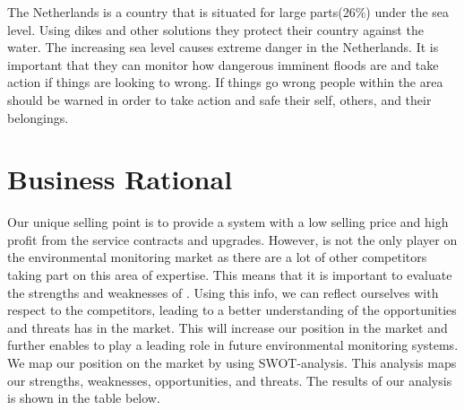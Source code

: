 The Netherlands is a country that is situated for large parts(26\%) under the sea level\cite{holland}. Using dikes and other solutions they protect their country against the water. The increasing sea level causes extreme danger in the Netherlands. It is important that they can monitor how dangerous imminent floods are and take action if things are looking to wrong. If things go wrong people within the area should be warned in order to take action and safe their self, others, and their belongings.

\section{Business Rational}

Our unique selling point is to provide a system with a low selling price and high profit from the service contracts and upgrades. However, \CompanyName{} is not the only player on the environmental monitoring market as there are a lot of other competitors taking part on this area of expertise. This means that it is important to evaluate the strengths and weaknesses of \CompanyName. Using this info, we can reflect ourselves with respect to the competitors, leading to a better understanding of the opportunities and threats \CompanyName has in the market.
This will increase our position in the market and further enables \CompanyName to play a leading role in future environmental monitoring systems.\\

We map our position on the market by using SWOT-analysis. This analysis maps our strengths, weaknesses, opportunities, and threats. The results of our analysis is shown in the table below.

